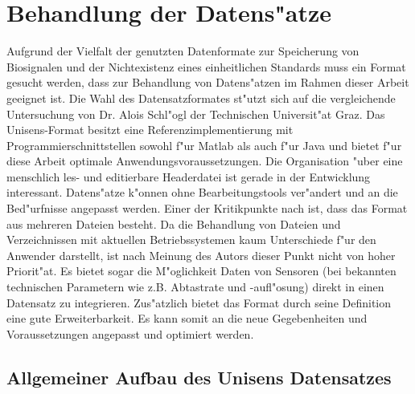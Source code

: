 \section{Behandlung der Datens"atze}

Aufgrund der Vielfalt der genutzten Datenformate zur Speicherung von Biosignalen und der Nichtexistenz eines einheitlichen Standards \cite{Schlogl2009, Varri2001, Wang2010} muss ein Format gesucht werden, dass zur Behandlung von Datens"atzen im Rahmen dieser Arbeit geeignet ist.
Die Wahl des Datensatzformates st"utzt sich auf die vergleichende Untersuchung \cite{Schlogl2009} von Dr. Alois Schl"ogl der Technischen Universit"at Graz.
Das Unisens-Format besitzt eine Referenzimplementierung mit Programmierschnittstellen sowohl f"ur Matlab als auch f"ur Java und bietet f"ur diese Arbeit optimale Anwendungsvoraussetzungen.
Die Organisation "uber eine menschlich les- und editierbare Headerdatei ist gerade in der Entwicklung interessant.
Datens"atze k"onnen ohne Bearbeitungstools ver"andert und an die Bed"urfnisse angepasst werden.
Einer der Kritikpunkte nach \cite{Schlogl2009} ist, dass das Format aus mehreren Dateien besteht.
Da die Behandlung von Dateien und Verzeichnissen mit aktuellen Betriebssystemen kaum Unterschiede f"ur den Anwender darstellt, ist nach Meinung des Autors dieser Punkt nicht von hoher Priorit"at.
Es bietet sogar die M"oglichkeit Daten von Sensoren (bei bekannten technischen Parametern wie z.B. Abtastrate und -aufl"osung) direkt in einen Datensatz zu integrieren.
Zus"atzlich bietet das Format durch seine Definition eine gute Erweiterbarkeit.
Es kann somit an die neue Gegebenheiten und Voraussetzungen angepasst und optimiert werden.


\subsection{Allgemeiner Aufbau des Unisens Datensatzes}

